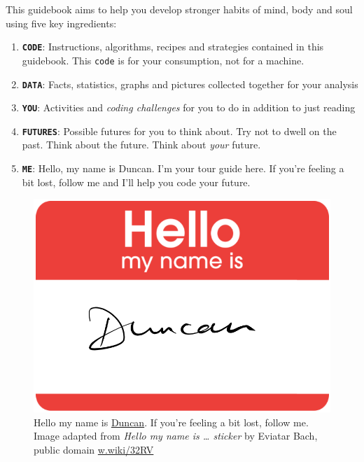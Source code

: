 \documentclass[
]{book}
\providecommand{\tightlist}{%
  \setlength{\itemsep}{0pt}\setlength{\parskip}{0pt}}
\begin{document}
This guidebook aims to help you develop stronger habits of mind, body and soul using five key ingredients:

\begin{enumerate}
\def\labelenumi{\arabic{enumi}.}
\tightlist
\item
  \textbf{\texttt{CODE}}: Instructions, algorithms, recipes and strategies contained in this guidebook. This \texttt{code} is for your consumption, not for a machine.
\item
  \textbf{\texttt{DATA}}: Facts, statistics, graphs and pictures collected together for your analysis
\item
  \textbf{\texttt{YOU}}: Activities and \emph{coding challenges} for you to do in addition to just reading
\item
  \textbf{\texttt{FUTURES}}: Possible futures for you to think about. Try not to dwell on the past. Think about the future. Think about \emph{your} future. \citep{thinkaboutthefuture, wroteforluck}
\item
  \textbf{\texttt{ME}}: Hello, my name is Duncan. I'm your tour guide here. If you're feeling a bit lost, follow me and I'll help you code your future.
\end{enumerate}

\begin{figure}

{\centering \includegraphics[width=0.69\linewidth]{images/Hello-my-name-is-Duncan} 

}

\caption{Hello my name is \href{https://en.wikipedia.org/wiki/Duncan_(given_name)}{Duncan}. If you're feeling a bit lost, follow me. Image adapted from \emph{Hello my name is \ldots{} sticker} by Eviatar Bach, public domain \href{https://w.wiki/32RV}{w.wiki/32RV}}\label{fig:hello-my-name-fig}
\end{figure}
\end{document}
